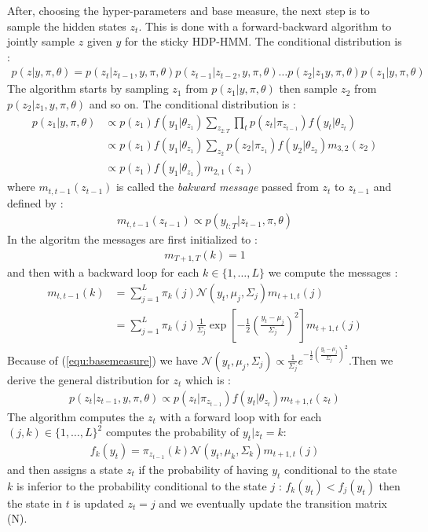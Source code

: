 After, choosing the hyper-parameters and base measure, the next step is to sample the hidden states $z_t$. This is done with a forward-backward algorithm to jointly sample $z$ given $y$ for the sticky HDP-HMM. The conditional distribution is : 
\begin{align*}
	p(z|y, \pi, \theta) = p(z_t|z_{t-1}, y, \pi, \theta) p(z_{t-1}|z_{t-2}, y, \pi, \theta) \dots p(z_2|z_1 y, \pi, \theta) p(z_1| y, \pi, \theta) 
\end{align*} 
The algorithm starts by sampling $z_1$ from $ p(z_1| y, \pi, \theta)$ then sample $z_2$ from $ p(z_2|z_1, y, \pi, \theta)$ and so on. The conditional distribution is :\begin{align*}
	 p(z_1| y, \pi, \theta) &\propto p(z_1)f(y_1|\theta_{z_1})\sum_{z_{2:T}} \prod_t p(z_t|\pi_{z_{t-1}})f(y_t|\theta_{z_t})\\&\propto  p(z_1)f(y_1|\theta_{z_1}) \sum_{z_2}p(z_2|\pi_{z_1})f(y_2|\theta_{z_2})m_{3,2}(z_2)
	 \\ &\propto  p(z_1)f(y_1|\theta_{z_1})m_{2,1}(z_1)
\end{align*}
where $m_{t,t-1}(z_{t-1})$ is called the \textit{bakward message} passed from $z_t$ to $z_{t-1}$ and defined by : 
\begin{align*}
	m_{t,t-1}(z_{t-1}) \propto p(y_{t:T}|z_{t-1},\pi,\theta)
\end{align*}
In the algoritm the messages are first initialized to :\begin{align*}
	m_{T+1,T}(k)=1
\end{align*}
and then with a backward loop for each $k\in \{1,\dots, L\}$ we compute the messages : \begin{align*}
	m_{t,t-1}(k)&=\sum^L_{j=1}\pi_k(j) \mathcal N(y_t, \mu_j, \Sigma_j)m_{t+1, t}(j)\\
	&=\sum^L_{j=1}\pi_k(j) \frac{1}{\Sigma_j}\exp\left[ -\frac{1}{2} \left( \frac{y_t-\mu_j}{\Sigma_j}\right)^2\right]m_{t+1, t}(j)
\end{align*}
Because of (\ref{equ:basemeasure}) we have $\mathcal N(y_t, \mu_j, \Sigma_j)\propto \frac{1}{\Sigma_j} e^{-\frac{1}{2} \left( \frac{y_t-\mu_j}{\Sigma_j}\right)^2}$.Then we derive the general distribution for $z_t$ which is : 
\begin{align*}
	p(z_t|z_{t-1}, y, \pi,\theta) \propto p(z_t|\pi_{z_{t-1}})f(y_t|\theta_{z_t})m_{t+1,t}(z_t)
\end{align*}
The algorithm computes the $z_t$ with a forward loop  with for each $(j,k)\in \{1,\dots, L\}^2$ computes the probability of $y_t|z_t=k$:
\begin{align*}
	f_k(y_t)=\pi_{z_{t-1}}(k)\mathcal N (y_t,\mu_k,\Sigma_k)m_{t+1,t}(j)
\end{align*}
and then assigns a state $z_t$ if the probability of having $y_t$ conditional to the state $k$ is inferior to the probability conditional to the state $j$  : $f_k(y_t)<f_j(y_t)$ then the state in $t$ is updated $z_t=j$ and we eventually update the transition matrix (N). \\

